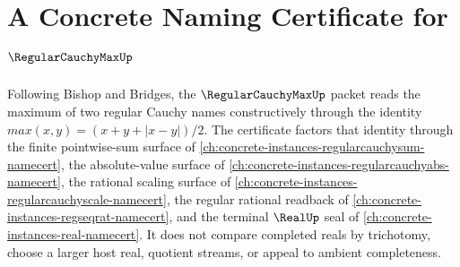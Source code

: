 \chapter{A Concrete Naming Certificate for $\RegularCauchyMaxUp$}
\label{ch:concrete-instances-regularcauchymax-namecert}

Following Bishop and Bridges, the $\RegularCauchyMaxUp$ packet reads the maximum of two regular Cauchy names constructively through the identity $max(x,y)=(x+y+|x-y|)/2$. The certificate factors that identity through the finite pointwise-sum surface of \autoref{ch:concrete-instances-regularcauchysum-namecert}, the absolute-value surface of \autoref{ch:concrete-instances-regularcauchyabs-namecert}, the rational scaling surface of \autoref{ch:concrete-instances-regularcauchyscale-namecert}, the regular rational readback of \autoref{ch:concrete-instances-regseqrat-namecert}, and the terminal $\RealUp$ seal of \autoref{ch:concrete-instances-real-namecert}. It does not compare completed reals by trichotomy, choose a larger host real, quotient streams, or appeal to ambient completeness.

